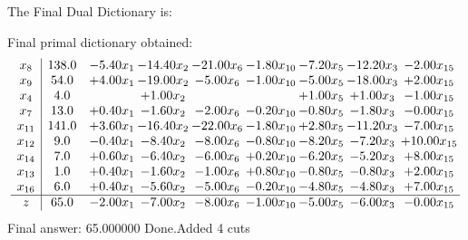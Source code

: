 \documentclass[8pt]{article}
\begin{document}
The Final Dual Dictionary is: 

 Final primal dictionary obtained: 
\[\begin{array}{c| c c@{\hskip 2pt} c@{\hskip 2pt} c@{\hskip 2pt} c@{\hskip 2pt} c@{\hskip 2pt} c@{\hskip 2pt} c@{\hskip 2pt} }
 x_{8}   &  138.0 & -5.40 x_{1} & -14.40 x_{2} & -21.00 x_{6} & -1.80 x_{10} & -7.20 x_{5} & -12.20 x_{3} & -2.00 x_{15}\\
 x_{9}   &  54.0 & +  4.00 x_{1} & -19.00 x_{2} & -5.00 x_{6} & -1.00 x_{10} & -5.00 x_{5} & -18.00 x_{3} & +  2.00 x_{15}\\
 x_{4}   &  4.0  &   & +  1.00 x_{2} &    &   & +  1.00 x_{5} & +  1.00 x_{3} & -1.00 x_{15}\\
 x_{7}   &  13.0 & +  0.40 x_{1} & -1.60 x_{2} & -2.00 x_{6} & -0.20 x_{10} & -0.80 x_{5} & -1.80 x_{3} & -0.00 x_{15}\\
 x_{11}   &  141.0 & +  3.60 x_{1} & -16.40 x_{2} & -22.00 x_{6} & -1.80 x_{10} & +  2.80 x_{5} & -11.20 x_{3} & -7.00 x_{15}\\
 x_{12}   &  9.0 & -0.40 x_{1} & -8.40 x_{2} & -8.00 x_{6} & -0.80 x_{10} & -8.20 x_{5} & -7.20 x_{3} & + 10.00 x_{15}\\
 x_{14}   &  7.0 & +  0.60 x_{1} & -6.40 x_{2} & -6.00 x_{6} & +  0.20 x_{10} & -6.20 x_{5} & -5.20 x_{3} & +  8.00 x_{15}\\
 x_{13}   &  1.0 & +  0.40 x_{1} & -1.60 x_{2} & -1.00 x_{6} & +  0.80 x_{10} & -0.80 x_{5} & -0.80 x_{3} & +  2.00 x_{15}\\
 x_{16}   &  6.0 & +  0.40 x_{1} & -5.60 x_{2} & -5.00 x_{6} & -0.20 x_{10} & -4.80 x_{5} & -4.80 x_{3} & +  7.00 x_{15}\\
\hline
z    &  65.0 & -2.00 x_{1} & -7.00 x_{2} & -8.00 x_{6} & -1.00 x_{10} & -5.00 x_{5} & -6.00 x_{3} & -0.00 x_{15}\\
\end{array}\]
 Final answer: 65.000000 
Done.Added 4 cuts 
\end{document}
